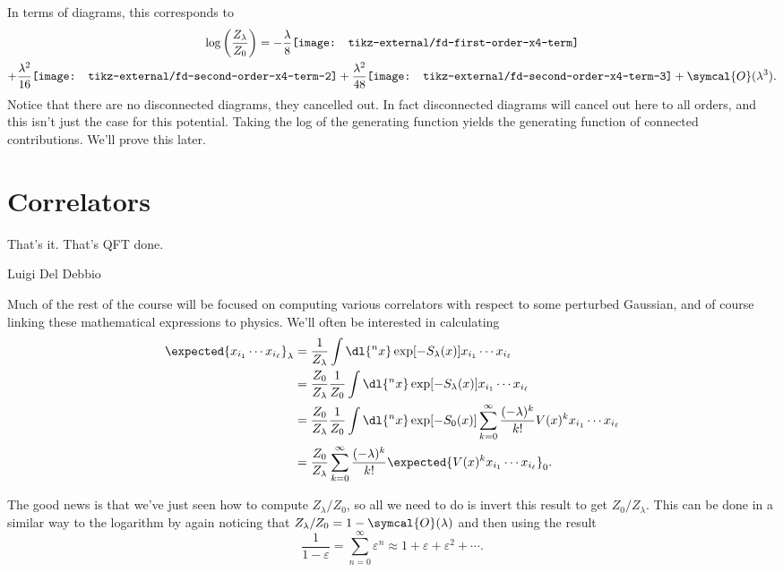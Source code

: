 \documentclass[fleqn]{NotesClass}
\newcommand{\order}{\symcal{O}}
\begin{document}
    In terms of diagrams, this corresponds to
    \begin{multline}
        \log\left( \frac{Z_\lambda}{Z_0} \right) = -\frac{\lambda}{8} 
        \vcenter{\hbox{\texttt{[image: tikz-external/fd-first-order-x4-term]}}}\\
        + \frac{\lambda^2}{16} \vcenter{\hbox{\texttt{[image: tikz-external/fd-second-order-x4-term-2]}}} + \frac{\lambda^2}{48} \vcenter{\hbox{\texttt{[image: tikz-external/fd-second-order-x4-term-3]}}} + \order(\lambda^3).
    \end{multline}
    Notice that there are no disconnected diagrams, they cancelled out.
    In fact disconnected diagrams will cancel out here to all orders, and this isn't just the case for this potential.
    Taking the log of the generating function yields the generating function of connected contributions.
    We'll prove this later.
    
    \section{Correlators}
    \epigraph{That's it. That's QFT done.}{Luigi Del Debbio}
    Much of the rest of the course will be focused on computing various correlators with respect to some perturbed Gaussian, and of course linking these mathematical expressions to physics.
    We'll often be interested in calculating
    \begin{align}
        \expected{x_{i_1} \dotsm x_{i_\ell}}_\lambda &= \frac{1}{Z_\lambda} \int \dl{^nx} \exp[-S_\lambda(x)] x_{i_1} \dotsm x_{i_\ell}\\
        &= \frac{Z_0}{Z_\lambda} \frac{1}{Z_0} \int \dl{^nx} \exp[-S_\lambda(x)] x_{i_1} \dotsm x_{i_\ell}\\
        &= \frac{Z_0}{Z_\lambda} \frac{1}{Z_0} \int \dl{^nx} \exp[-S_0(x)] \sum_{k = 0}^{\infty} \frac{(-\lambda)^k}{k!} V(x)^k x_{i_1} \dotsm x_{i_\ell}\\
        &= \frac{Z_0}{Z_\lambda} \sum_{k = 0}^{\infty} \frac{(-\lambda)^k}{k!} \expected{V(x)^kx_{i_1} \dotsm x_{i_\ell}}_0.
    \end{align}
    
    The good news is that we've just seen how to compute \(Z_\lambda/Z_0\), so all we need to do is invert this result to get \(Z_0/Z_\lambda\).
    This can be done in a similar way to the logarithm by again noticing that \(Z_\lambda/Z_0 = 1 - \order(\lambda)\) and then using the result
    \begin{equation}
        \frac{1}{1 - \varepsilon} = \sum_{n = 0}^{\infty} \varepsilon^n \approx 1 + \varepsilon + \varepsilon^2 + \dotsb.
    \end{equation}
    
\end{document}
